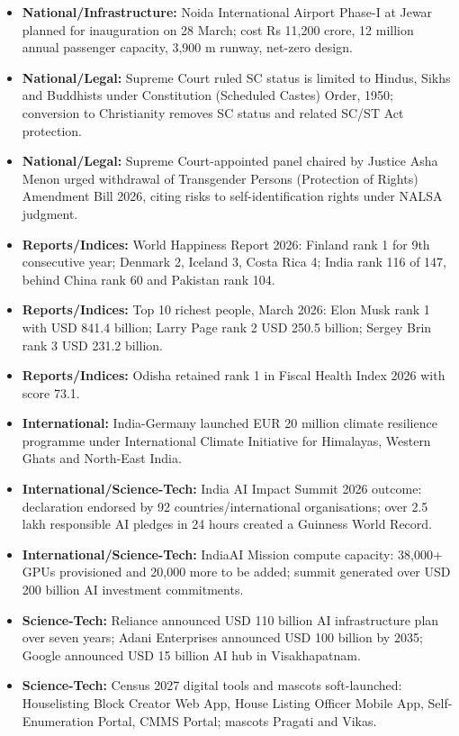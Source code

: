 \documentclass[10pt,a4paper]{article}
\begin{document}
\begin{itemize}
    \item \textbf{National/Infrastructure:} Noida International Airport Phase-I at Jewar planned for inauguration on 28 March; cost Rs 11,200 crore, 12 million annual passenger capacity, 3,900 m runway, net-zero design.
    \item \textbf{National/Legal:} Supreme Court ruled SC status is limited to Hindus, Sikhs and Buddhists under Constitution (Scheduled Castes) Order, 1950; conversion to Christianity removes SC status and related SC/ST Act protection.
    \item \textbf{National/Legal:} Supreme Court-appointed panel chaired by Justice Asha Menon urged withdrawal of Transgender Persons (Protection of Rights) Amendment Bill 2026, citing risks to self-identification rights under NALSA judgment.
    \item \textbf{Reports/Indices:} World Happiness Report 2026: Finland rank 1 for 9th consecutive year; Denmark 2, Iceland 3, Costa Rica 4; India rank 116 of 147, behind China rank 60 and Pakistan rank 104.
    \item \textbf{Reports/Indices:} Top 10 richest people, March 2026: Elon Musk rank 1 with USD 841.4 billion; Larry Page rank 2 USD 250.5 billion; Sergey Brin rank 3 USD 231.2 billion.
    \item \textbf{Reports/Indices:} Odisha retained rank 1 in Fiscal Health Index 2026 with score 73.1.
    \item \textbf{International:} India-Germany launched EUR 20 million climate resilience programme under International Climate Initiative for Himalayas, Western Ghats and North-East India.
    \item \textbf{International/Science-Tech:} India AI Impact Summit 2026 outcome: declaration endorsed by 92 countries/international organisations; over 2.5 lakh responsible AI pledges in 24 hours created a Guinness World Record.
    \item \textbf{International/Science-Tech:} IndiaAI Mission compute capacity: 38,000+ GPUs provisioned and 20,000 more to be added; summit generated over USD 200 billion AI investment commitments.
    \item \textbf{Science-Tech:} Reliance announced USD 110 billion AI infrastructure plan over seven years; Adani Enterprises announced USD 100 billion by 2035; Google announced USD 15 billion AI hub in Visakhapatnam.
    \item \textbf{Science-Tech:} Census 2027 digital tools and mascots soft-launched: Houselisting Block Creator Web App, House Listing Officer Mobile App, Self-Enumeration Portal, CMMS Portal; mascots Pragati and Vikas.

\end{itemize}
\end{document}
